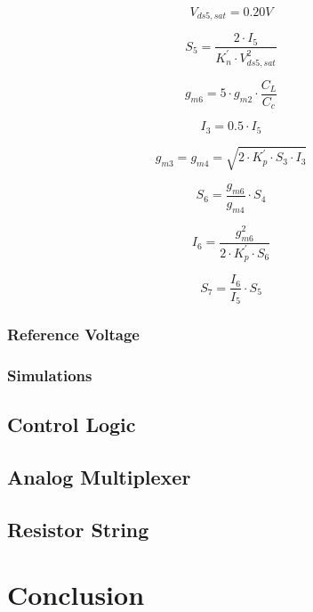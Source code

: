 \documentclass[parskip,oneside,colorbacktitle,10pt,accentcolor=tud1b]{tudreport}
\begin{document}
\begin{equation}
V_{ds5,sat} = 0.20 V
\end{equation}

\begin{equation}
S_5 = \frac{2 \cdot I_5}{K^{'}_n \cdot V_{ds5,sat}^2}
\end{equation}

\begin{equation}
g_{m6} = 5 \cdot g_{m2} \cdot \frac{C_L}{C_c}
\end{equation}

\begin{equation}
I_3 = 0.5 \cdot I_5
\end{equation}

\begin{equation}
g_{m3} = g_{m4} = \sqrt{2 \cdot K^{'}_{p} \cdot S_3 \cdot I_3}
\end{equation}

\begin{equation}
S_6 = \frac{g_{m6}}{g_{m4}} \cdot S_4
\end{equation}

\begin{equation}
I_6 = \frac{g_{m6}^2}{2 \cdot K^{'}_{p} \cdot S_6}
\end{equation}

\begin{equation}
S_7 = \frac{I_6}{I_5} \cdot S_5
\end{equation}

\subsection{Reference Voltage}

\subsection{Simulations}

\section{Control Logic}

\section{Analog Multiplexer}

\section{Resistor String}

\chapter{Conclusion}
\end{document}
